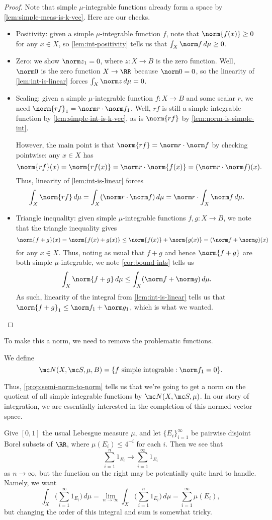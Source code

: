 \documentclass[../notes.tex]{subfiles}
\begin{document}
\begin{proof}
	Note that simple $\mu$-integrable functions already form a space by \autoref{lem:simple-meas-is-k-vec}. Here are our checks.
	\begin{itemize}
		\item Positivity: given a simple $\mu$-integrable function $f$, note that $\norm{f(x)}\ge0$ for any $x\in X$, so \autoref{lem:int-positivity} tells us that $\int_X\norm f\,d\mu\ge0$.
		\item Zero: we show $\norm z_1=0$, where $z\colon X\to B$ is the zero function. Well, $\norm0$ is the zero function $X\to\RR$ because $\norm0=0$, so the linearity of \autoref{lem:int-is-linear} forces $\int_X\norm z\,d\mu=0$.
		\item Scaling: given a simple $\mu$-integrable function $f\colon X\to B$ and some scalar $r$, we need $\norm{rf}_1=\norm r\cdot\norm f_1$. Well, $rf$ is still a simple integrable function by \autoref{lem:simple-int-is-k-vec}, as is $\norm{rf}$ by \autoref{lem:norm-is-simple-int}.

		However, the main point is that $\norm{rf}=\norm r\cdot\norm f$ by checking pointwise: any $x\in X$ has
		\[\norm{rf}(x)=\norm{rf(x)}=\norm r\cdot\norm{f(x)}=(\norm r\cdot\norm f)(x).\]
		Thus, linearity of \autoref{lem:int-is-linear} forces
		\[\int_X\norm{rf}\,d\mu=\int_X(\norm r\cdot\norm f)\,d\mu=\norm r\cdot\int_X\norm f\,d\mu.\]
		\item Triangle inequality: given simple $\mu$-integrable functions $f,g\colon X\to B$, we note that the triangle inequality gives
		\[\norm{f+g}(x)=\norm{f(x)+g(x)}\le\norm{f(x)}+\norm{g(x)}=(\norm f+\norm g)(x)\]
		for any $x\in X$. Thus, noting as usual that $f+g$ and hence $\norm{f+g}$ are both simple $\mu$-integrable, we note \autoref{cor:bound-ints} tells us
		\[\int_X\norm{f+g}\,d\mu\le\int_X(\norm f+\norm g)\,d\mu.\]
		As such, linearity of the integral from \autoref{lem:int-is-linear} tells us that $\norm{f+g}_1\le\norm f_1+\norm g_1$, which is what we wanted.
		\qedhere
	\end{itemize}
\end{proof}
To make this a norm, we need to remove the problematic functions.
\begin{notation}
	We define
	\[\mc N(X,\mc S,\mu,B)=\{f\text{ simple integrable}:\norm f_1=0\}.\]
\end{notation}
Thus, \autoref{prop:semi-norm-to-norm} tells us that we're going to get a norm on the quotient of all simple integrable functions by $\mc N(X,\mc S,\mu)$. In our story of integration, we are essentially interested in the completion of this normed vector space.
\begin{example}
	Give $[0,1]$ the usual Lebesgue measure $\mu$, and let $\{E_i\}_{i=1}^\infty$ be pairwise disjoint Borel subsets of $\RR$, where $\mu(E_i)\le 4^{-i}$ for each $i$. Then we see that
	\[\sum_{i=1}^n1_{E_i}\to\sum_{i=1}^\infty1_{E_i}\]
	as $n\to\infty$, but the function on the right may be potentially quite hard to handle. Namely, we want
	\[\int_X\Bigg(\sum_{i=1}^\infty1_{E_i}\Bigg)\,d\mu=\lim_{n\to\infty}\int_X\Bigg(\sum_{i=1}^n1_{E_i}\Bigg)\,d\mu=\sum_{i=1}^\infty\mu(E_i),\]
	but changing the order of this integral and sum is somewhat tricky.
\end{example}
\end{document}
